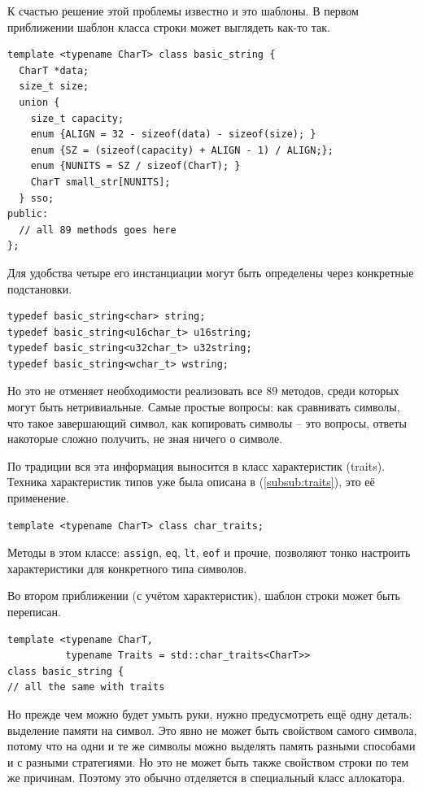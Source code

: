 \documentclass[a4paper,12pt,oneside]{article}
\begin{document}
К счастью решение этой проблемы известно и это шаблоны. В первом приближении шаблон класса строки может выглядеть как-то так.

\begin{lstlisting}
template <typename CharT> class basic_string {
  CharT *data;
  size_t size;
  union {
    size_t capacity;
    enum {ALIGN = 32 - sizeof(data) - sizeof(size); }
    enum {SZ = (sizeof(capacity) + ALIGN - 1) / ALIGN;};
    enum {NUNITS = SZ / sizeof(CharT); }
    CharT small_str[NUNITS];
  } sso;
public:
  // all 89 methods goes here
};
\end{lstlisting}

Для удобства четыре его инстанциации могут быть определены через конкретные подстановки.

\begin{lstlisting}
typedef basic_string<char> string;
typedef basic_string<u16char_t> u16string;
typedef basic_string<u32char_t> u32string;
typedef basic_string<wchar_t> wstring;
\end{lstlisting}

Но это не отменяет необходимости реализовать все 89 методов, среди которых могут быть нетривиальные. Самые простые вопросы: как сравнивать символы, что такое завершающий символ, как копировать символы -- это вопросы, ответы накоторые сложно получить, не зная ничего о символе.

По традиции вся эта информация выносится в класс характеристик (traits). Техника характеристик типов уже была описана в (\ref{subsub:traits}), это её применение.

\begin{lstlisting}
template <typename CharT> class char_traits;
\end{lstlisting}

Методы в этом классе: \lstinline!assign!, \lstinline!eq!, \lstinline!lt!, \lstinline!eof! и прочие, позволяют тонко настроить характеристики для конкретного типа символов.

Во втором приближении (с учётом характеристик), шаблон строки может быть переписан.

\begin{lstlisting}
template <typename CharT,
          typename Traits = std::char_traits<CharT>> 
class basic_string {
// all the same with traits
\end{lstlisting}

Но прежде чем можно будет умыть руки, нужно предусмотреть ещё одну деталь: выделение памяти на символ. Это явно не может быть свойством самого символа, потому что на одни и те же символы можно выделять память разными способами и с разными стратегиями. Но это не может быть также свойством строки по тем же причинам. Поэтому это обычно отделяется в специальный класс аллокатора.
\end{document}
